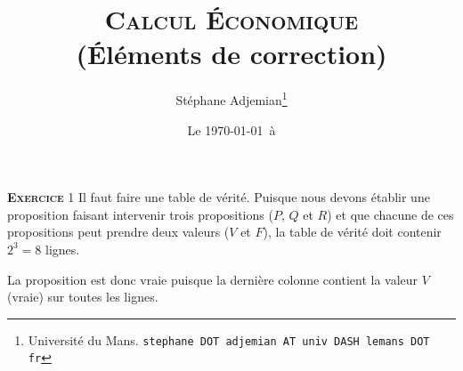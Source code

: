 \documentclass[10pt,a4paper,notitlepage]{article}
\newcommand{\exercice}[1]{\textsc{\textbf{Exercice}} #1}
\begin{document}
\title{\textsc{Calcul Économique}\\\textbf{(Éléments de correction)}}
\author{Stéphane Adjemian\thanks{Université du Mans. \texttt{stephane DOT adjemian AT univ DASH lemans DOT fr}}}
\date{Le \today\ à \thistime}

\maketitle

\exercice{1} Il faut faire une table de vérité. Puisque nous devons
établir une proposition faisant intervenir trois propositions ($P$,
$Q$ et $R$) et que chacune de ces propositions peut prendre deux
valeurs ($V$ et $F$), la table de vérité doit contenir $2^3=8$ lignes.

\begin{table}[H]
  \centering
{}
\end{table}

La proposition est donc vraie puisque la dernière colonne contient la
valeur $V$ (vraie) sur toutes les lignes.

\bigskip
\end{document}
